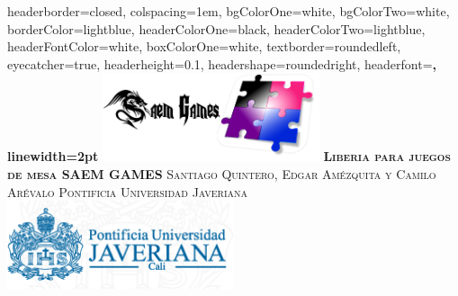\documentclass[landscape,a0paper,fontscale=0.285]{baposter} %
\begin{document}
\begin{poster}
{
headerborder=closed, %
colspacing=1em, %
bgColorOne=white, %
bgColorTwo=white, %
borderColor=lightblue, %
headerColorOne=black, %
headerColorTwo=lightblue, %
headerFontColor=white, %
boxColorOne=white, %
textborder=roundedleft, %
eyecatcher=true, %
headerheight=0.1\textheight, %
headershape=roundedright, %
headerfont=\Large\bf\textsc, %
linewidth=2pt %
}
%
{\includegraphics[height=7em]{logohtml.png}} %
{\bf\textsc{Liberia para juegos de mesa SAEM GAMES}\vspace{0.5em}} %
{\textsc{ Santiago Quintero, Edgar Am\'ezquita y Camilo Ar\'evalo
\newline Pontificia Universidad Javeriana}} %
{\includegraphics[height=7em]{img-logoHeader.png}} %


\end{poster}
\end{document}
